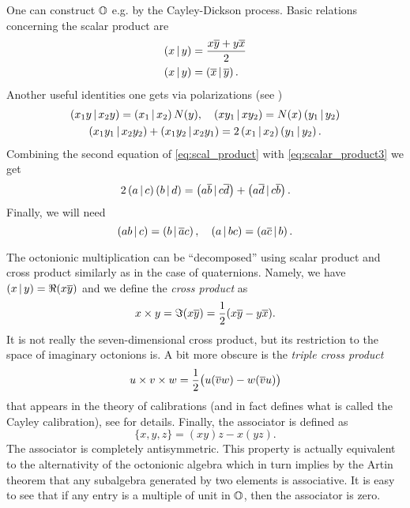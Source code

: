One can construct $\mathbb{O}$ e.g. by the Cayley-Dickson process. Basic relations concerning the scalar product are 
\begin{equation}\label{eq:scal_product}
\begin{aligned}
\left( x \,|\, y \right) & = \frac{ x\overline{y} + y\overline{x}}{2}\\
\left( x \,|\, y \right) & = \left( \overline{x} \,|\, \overline{y} \right).
\end{aligned}
\end{equation}
Another useful  identities one gets via polarizations (see \cite[p. 5]{springer_octonions_2000})
\begin{gather}
\left( x_1y \,|\, x_2y \right) = \left( x_1 \,|\, x_2 \right) N(y), \quad \left( xy_1 \,|\, xy_2 \right) = N(x)\left( y_1 \,|\, y_2 \right) \label{eq:scalar_product2}\\
\left( x_1y_1 \,|\, x_2y_2 \right) + \left( x_1y_2 \,|\, x_2y_1 \right) = 2\left( x_1 \,|\, x_2 \right)\left( y_1 \,|\, y_2 \right).\label{eq:scalar_product3}
\end{gather}
Combining the second equation of \eqref{eq:scal_product} with \eqref{eq:scalar_product3} we get
\begin{equation}\label{eq:scalar_product4}
2\left( a \,|\, c \right)\left( b \,|\, d \right) = \left( a\overline{b} \,|\, c\overline{d} \right) + \left( a\overline{d} \,|\, c\overline{b} \right).
\end{equation}
Finally, we will need
\begin{equation}\label{eq:scalar_product5}
\left( ab \,|\, c \right) = \left( b \,|\, \overline{a}c \right), \quad \left( a \,|\, bc \right) = \left( a\overline{c} \,|\, b \right).
\end{equation}

The octonionic multiplication  can be ``decomposed'' using scalar product and cross product similarly  as in the case of quaternions. Namely, we have $\left( x \,|\, y \right) = \Re( x\overline{y})$ and we define the \emph{cross product} as \[x \times y = \Im (x\overline{y}) = \frac{1}{2}( x\overline{y} - y\overline{x}).\] It is not really the seven-dimensional cross product, but its restriction to the space of imaginary octonions is. A bit more obscure is the \emph{triple cross product} 
\[
u \times v \times w = \frac{1}{2}\bigl( u(\overline{v}w) - w(\overline{v}u) \bigr)
\]
that appears in the theory of calibrations (and in fact defines what is called the Cayley calibration), see \cite{harvey_spinors_1990} for details. Finally, the associator is defined as
\[
\{ x,y,z \} = (xy)z - x(yz).
\]
The associator is completely antisymmetric. This property is actually equivalent to the alternativity of the octonionic algebra which in turn implies by the Artin theorem that any subalgebra generated by two elements is associative. It is easy to see that if any entry is a multiple of unit in $\mathbb{O}$, then the associator is zero. 


